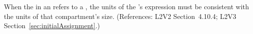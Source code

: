 When the  in an \InitialAssignment refers to a
\Compartment, the units of the \InitialAssignment's  expression
must be consistent with the units of that compartment's size.  (References:
L2V2 Section~4.10.4; L2V3 Section~\ref{sec:initialAssignment}.)
